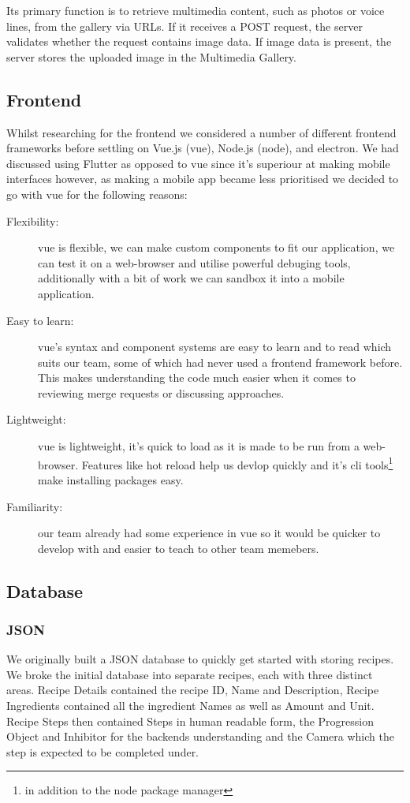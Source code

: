 \documentclass{article}
\begin{document}
    Its primary function is to retrieve multimedia content, such as photos or voice lines, from the gallery via URLs. If it receives a POST request, the server validates whether the request contains image data. If image data is present, the server stores the uploaded image in the Multimedia Gallery.
    
    \subsection{Frontend}
    Whilst researching for the frontend we considered a number of different frontend frameworks before settling on Vue.js (vue), Node.js (node), and electron. We had discussed using Flutter as opposed to vue since it's superiour at making mobile interfaces however, as making a mobile app became less prioritised we decided to go with vue for the following reasons: 
    \begin{description}
      \item[Flexibility:] vue is flexible, we can make custom components to fit our application, we can test it on a web-browser and utilise powerful debuging tools, additionally with a bit of work we can sandbox it into a mobile application.
      \item[Easy to learn:] vue's syntax and component systems are easy to learn and to read which suits our team, some of which had never used a frontend framework before. This makes understanding the code much easier when it comes to reviewing merge requests or discussing approaches.
      \item[Lightweight:] vue is lightweight, it's quick to load as it is made to be run from a web-browser. Features like hot reload help us devlop quickly and it's cli tools\footnote{in addition to the node package manager} make installing packages easy.
      \item[Familiarity:] our team already had some experience in vue so it would be quicker to develop with and easier to teach to other team memebers.
    \end{description}


 
    \subsection{Database}
    \subsubsection{JSON}
    We originally built a JSON database to quickly get started with storing recipes. We broke the initial database into separate recipes, each with three distinct areas. Recipe Details contained the recipe ID, Name and Description, Recipe Ingredients contained all the ingredient Names as well as Amount and Unit. Recipe Steps then contained Steps in human readable form, the Progression Object and Inhibitor for the backends understanding and the Camera which the step is expected to be completed under.
    
\end{document}

